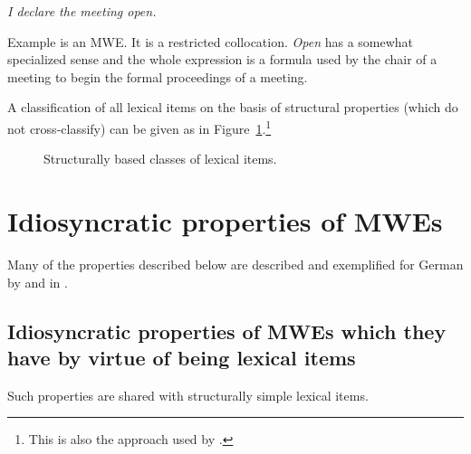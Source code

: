 \documentclass[output=paper]{langsci/langscibook}
\begin{document}
\begin{exe}
\ex\label{ex:ex04} \textit{I declare the meeting open.}
\end{exe}

Example  is an MWE. It is a restricted collocation. \textit{Open} has a somewhat specialized sense and the whole expression is a formula used by the chair of a meeting to begin the formal proceedings of a meeting. 

A classification of all lexical items on the basis of structural properties (which do not cross-classify) can be given as in Figure~\ref{fig:05:01}.\footnote{This is also the approach used by \citet{Fiedler2007}.}

\begin{figure}[h]
\centering
{}
\caption{Structurally based classes of lexical items.}
\label{fig:05:01}
\end{figure}


\section{Idiosyncratic properties of MWEs}

Many of the properties described below are described and exemplified for German by \citet{Burger2010} and in \citet{Jaki2014}.

\subsection{Idiosyncratic properties of MWEs which they have by virtue of being lexical items}

Such properties are shared with structurally simple lexical items.
\end{document}

